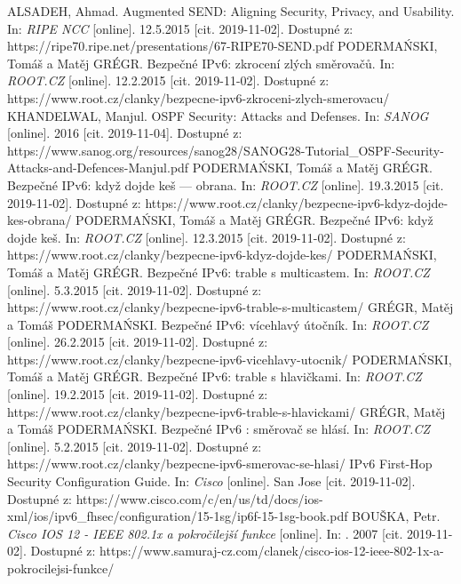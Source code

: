 \begin{literatura}{99}
	
ALSADEH, Ahmad. Augmented SEND: Aligning Security, Privacy, and Usability. In: \textit{RIPE NCC} [online]. 12.5.2015 [cit. 2019-11-02]. Dostupné z: https://ripe70.ripe.net/presentations/67-RIPE70-SEND.pdf
PODERMAŃSKI, Tomáš a Matěj GRÉGR. Bezpečné IPv6: zkrocení zlých směrovačů. In: \textit{ROOT.CZ} [online]. 12.2.2015 [cit. 2019-11-02]. Dostupné z: https://www.root.cz/clanky/bezpecne-ipv6-zkroceni-zlych-smerovacu/
KHANDELWAL, Manjul. OSPF Security: Attacks and Defenses. In: \textit{SANOG} [online]. 2016 [cit. 2019-11-04]. Dostupné z: https://www.sanog.org/resources/sanog28/SANOG28-Tutorial\_OSPF-Security-Attacks-and-Defences-Manjul.pdf
PODERMAŃSKI, Tomáš a Matěj GRÉGR. Bezpečné IPv6: když dojde keš --- obrana. In: \textit{ROOT.CZ} [online]. 19.3.2015 [cit. 2019-11-02]. Dostupné z: https://www.root.cz/clanky/bezpecne-ipv6-kdyz-dojde-kes-obrana/
PODERMAŃSKI, Tomáš a Matěj GRÉGR. Bezpečné IPv6: když dojde keš. In: \textit{ROOT.CZ} [online]. 12.3.2015 [cit. 2019-11-02]. Dostupné z: https://www.root.cz/clanky/bezpecne-ipv6-kdyz-dojde-kes/
PODERMAŃSKI, Tomáš a Matěj GRÉGR. Bezpečné IPv6: trable s multicastem. In: \textit{ROOT.CZ} [online]. 5.3.2015 [cit. 2019-11-02]. Dostupné z: https://www.root.cz/clanky/bezpecne-ipv6-trable-s-multicastem/
GRÉGR, Matěj a Tomáš PODERMAŃSKI. Bezpečné IPv6: vícehlavý útočník. In: \textit{ROOT.CZ} [online]. 26.2.2015 [cit. 2019-11-02]. Dostupné z: https://www.root.cz/clanky/bezpecne-ipv6-vicehlavy-utocnik/
PODERMAŃSKI, Tomáš a Matěj GRÉGR. Bezpečné IPv6: trable s hlavičkami. In: \textit{ROOT.CZ} [online]. 19.2.2015 [cit. 2019-11-02]. Dostupné z: https://www.root.cz/clanky/bezpecne-ipv6-trable-s-hlavickami/
GRÉGR, Matěj a Tomáš PODERMAŃSKI. Bezpečné IPv6 : směrovač se hlásí. In: \textit{ROOT.CZ} [online]. 5.2.2015 [cit. 2019-11-02]. Dostupné z: https://www.root.cz/clanky/bezpecne-ipv6-smerovac-se-hlasi/
IPv6 First-Hop Security Configuration Guide. In: \textit{Cisco} [online]. San Jose [cit. 2019-11-02]. Dostupné z: https://www.cisco.com/c/en/us/td/docs/ios-xml/ios/ipv6\_fhsec/configuration/15-1sg/ip6f-15-1sg-book.pdf
BOUŠKA, Petr. \textit{Cisco IOS 12 - IEEE 802.1x a pokročilejší funkce} [online]. In: . 2007 [cit. 2019-11-02]. Dostupné z: https://www.samuraj-cz.com/clanek/cisco-ios-12-ieee-802-1x-a-pokrocilejsi-funkce/

\end{literatura}
